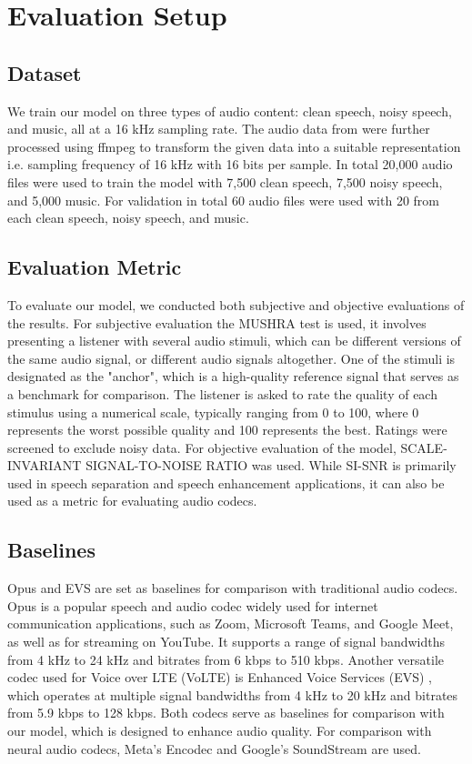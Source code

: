 \documentclass[12pt]{report}
\begin{document}
\chapter{Evaluation Setup}
\section{Dataset}
We train our model on three types of audio content: clean speech, noisy speech, and music, all at a 16 kHz sampling rate. The audio data from \cite{muscan} were further processed using ffmpeg to transform the given data into a suitable representation i.e. sampling frequency of 16 kHz with 16 bits per sample. In total 20,000 audio files were used to train the model with 7,500 clean speech, 7,500 noisy speech, and 5,000 music. For validation in total 60 audio files were used with 20 from each clean speech, noisy speech, and music.

\section{Evaluation Metric}
To evaluate our model, we conducted both subjective and objective evaluations of the results. For subjective evaluation the MUSHRA\cite{itu-r-bs1534-1} test is used, it involves presenting a listener with several audio stimuli, which can be different versions of the same audio signal, or different audio signals altogether. One of the stimuli is designated as the "anchor", which is a high-quality reference signal that serves as a benchmark for comparison. The listener is asked to rate the quality of each stimulus using a numerical scale, typically ranging from 0 to 100, where 0 represents the worst possible quality and 100 represents the best. Ratings were screened to exclude noisy data. For objective evaluation of the model, SCALE-INVARIANT SIGNAL-TO-NOISE RATIO was used. While SI-SNR is primarily used in speech separation and speech enhancement applications, it can also be used as a metric for evaluating audio codecs.

\section{Baselines}
Opus and EVS are set as baselines for comparison with traditional audio codecs. Opus \cite{opus_codec} is a popular speech and audio codec widely used for internet communication applications, such as Zoom, Microsoft Teams, and Google Meet, as well as for streaming on YouTube. It supports a range of signal bandwidths from 4 kHz to 24 kHz and bitrates from 6 kbps to 510 kbps. Another versatile codec used for Voice over LTE (VoLTE) is Enhanced Voice Services (EVS) \cite{evs_codec}, which operates at multiple signal bandwidths from 4 kHz to 20 kHz and bitrates from 5.9 kbps to 128 kbps. Both codecs serve as baselines for comparison with our model, which is designed to enhance audio quality. For comparison with neural audio codecs, Meta's Encodec \cite{defossez2022high} and Google's SoundStream \cite{zeghidour2021soundstream} are used.
\end{document}

